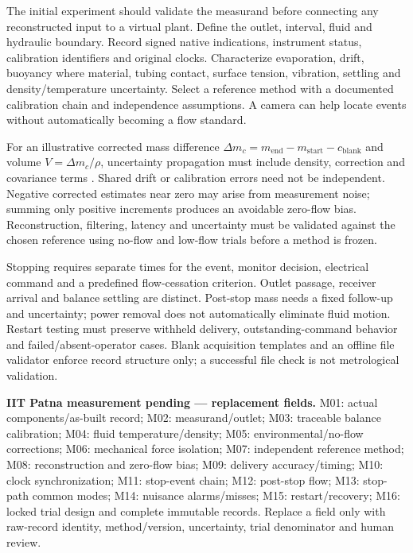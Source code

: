 \documentclass[journal,10pt,letterpaper]{IEEEtran}
\begin{document}
The initial experiment should validate the measurand before connecting
any reconstructed input to a virtual plant. Define the outlet, interval,
fluid and hydraulic boundary. Record signed native indications,
instrument status, calibration identifiers and original clocks.
Characterize evaporation, drift, buoyancy where material, tubing
contact, surface tension, vibration, settling and density/temperature
uncertainty. Select a reference method with a documented calibration
chain and independence assumptions. A camera can help locate events
without automatically becoming a flow standard.

For an illustrative corrected mass difference
\(\Delta m_c=m_{\mathrm{end}}-m_{\mathrm{start}}-c_{\mathrm{blank}}\)
and volume \(V=\Delta m_c/\rho\), uncertainty propagation must include
density, correction and covariance terms \cite{R09}. Shared drift or
calibration errors need not be independent. Negative corrected estimates
near zero may arise from measurement noise; summing only positive
increments produces an avoidable zero-flow bias. Reconstruction,
filtering, latency and uncertainty must be validated against the chosen
reference using no-flow and low-flow trials before a method is frozen.

Stopping requires separate times for the event, monitor decision,
electrical command and a predefined flow-cessation criterion. Outlet
passage, receiver arrival and balance settling are distinct. Post-stop
mass needs a fixed follow-up and uncertainty; power removal does not
automatically eliminate fluid motion. Restart testing must preserve
withheld delivery, outstanding-command behavior and
failed/absent-operator cases. Blank acquisition templates and an offline
file validator enforce record structure only; a successful file check is
not metrological validation.

\begin{tcolorbox}[breakable,colback=pendingbg,colframe=pendingborder,boxrule=.5pt,arc=0pt,left=4pt,right=4pt,top=4pt,bottom=4pt]\textbf{IIT Patna measurement pending --- replacement fields.} M01:
actual components/as-built record; M02: measurand/outlet; M03: traceable
balance calibration; M04: fluid temperature/density; M05:
environmental/no-flow corrections; M06: mechanical force isolation; M07:
independent reference method; M08: reconstruction and zero-flow bias;
M09: delivery accuracy/timing; M10: clock synchronization; M11:
stop-event chain; M12: post-stop flow; M13: stop-path common modes; M14:
nuisance alarms/misses; M15: restart/recovery; M16: locked trial design
and complete immutable records. Replace a field only with raw-record
identity, method/version, uncertainty, trial denominator and human
review.\end{tcolorbox}
\end{document}

